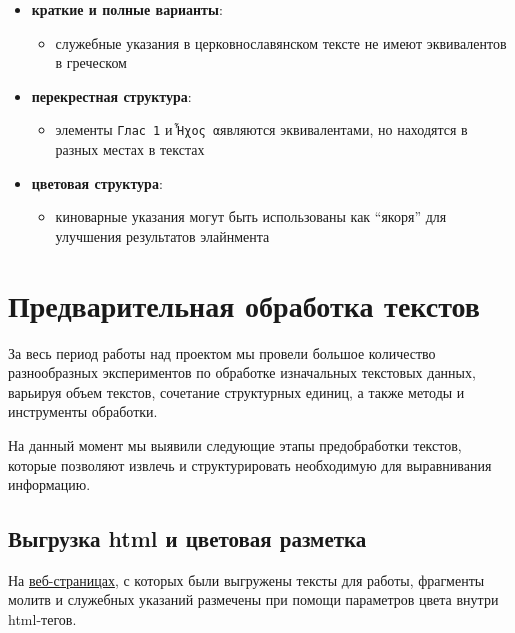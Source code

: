 \documentclass[
  letterpaper,
]{book}
\providecommand{\tightlist}{%
  \setlength{\itemsep}{0pt}\setlength{\parskip}{0pt}}\usepackage{longtable,booktabs,array}
\begin{document}
\begin{itemize}
\item
  \textbf{краткие и полные варианты}:

  \begin{itemize}
  \tightlist
  \item
    служебные указания в церковнославянском тексте не имеют эквивалентов
    в греческом
  \end{itemize}
\item
  \textbf{перекрестная структура}:

  \begin{itemize}
  \tightlist
  \item
    элементы \texttt{Глас\ 1} и
    \texttt{Ἦχος\ α\textquotesingle{}}являются эквивалентами, но
    находятся в разных местах в текстах
  \end{itemize}
\item
  \textbf{цветовая структура}:

  \begin{itemize}
  \tightlist
  \item
    киноварные указания могут быть использованы как ``якоря'' для
    улучшения результатов элайнмента
  \end{itemize}
\end{itemize}


\hypertarget{sec-about_preprocessing}{%
\chapter{Предварительная обработка
текстов}\label{sec-about_preprocessing}}

За весь период работы над проектом мы провели большое количество
разнообразных экспериментов по обработке изначальных текстовых данных,
варьируя объем текстов, сочетание структурных единиц, а также методы и
инструменты обработки.

На данный момент мы выявили следующие этапы предобработки текстов,
которые позволяют извлечь и структурировать необходимую для выравнивания
информацию.

\hypertarget{sec-html_color}{%
\section{Выгрузка html и цветовая разметка}\label{sec-html_color}}

На \protect\hyperlink{sec-about_pent}{веб-страницах}, с которых были
выгружены тексты для работы, фрагменты молитв и служебных указаний
размечены при помощи параметров цвета внутри html-тегов.
\end{document}
